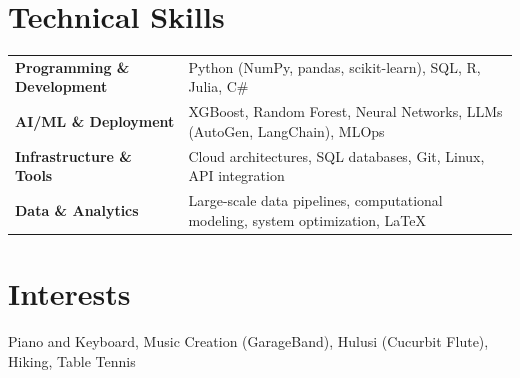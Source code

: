 \documentclass[a4paper,12pt]{article}
\begin{document}
\section{Technical Skills}
\begin{tabularx}{\linewidth}{@{}l X@{}}
\textbf{Programming \& Development}  &  \hfill \normalsize{Python (NumPy, pandas, scikit-learn), SQL, R, Julia, C\#}\\ 
\textbf{AI/ML \& Deployment}  & \hfill \normalsize{XGBoost, Random Forest, Neural Networks, LLMs (AutoGen, LangChain), MLOps}\\ 
\textbf{Infrastructure \& Tools}  & \hfill \normalsize{Cloud architectures, SQL databases, Git, Linux, API integration}\\ 
\textbf{Data \& Analytics}  & \hfill \normalsize{Large-scale data pipelines, computational modeling, system optimization, \LaTeX}
\end{tabularx} %




\section{Interests}

Piano and Keyboard, Music Creation (GarageBand), Hulusi (Cucurbit Flute), Hiking, Table Tennis




\end{document}
